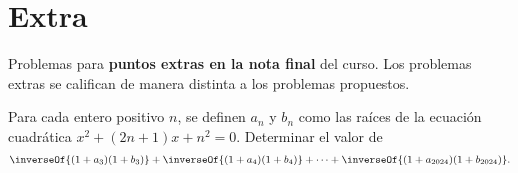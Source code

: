 \section{Extra}

Problemas para \textbf{puntos extras en la nota final} del curso.
Los problemas extras se califican de manera distinta a los problemas propuestos.

\begin{problem}
    Para cada entero positivo $n$, se definen $a_n$ y $b_n$ como las raíces de la ecuación cuadrática $x^2 + (2n + 1)x + n^2 = 0$.
    Determinar el valor de
    \[
        \inverseOf{(1 + a_3)(1 + b_3)} + \inverseOf{(1 + a_4)(1 + b_4)} + \cdots + \inverseOf{(1 + a_{2024})(1 + b_{2024})}.
    \]
\end{problem}